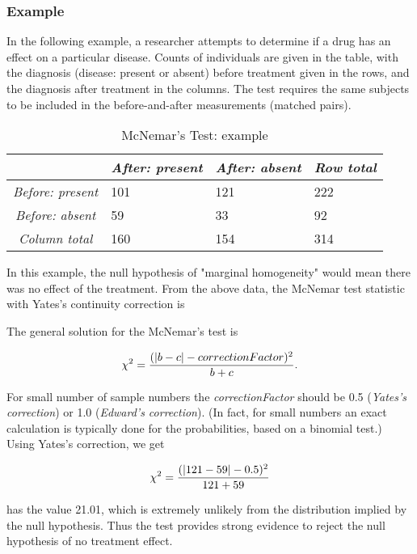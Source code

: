 \subsubsection{Example}

In the following example, a researcher attempts to determine if a drug has an effect on a particular disease. Counts of individuals are given in the table, with the diagnosis (disease: present or absent) before treatment given in the rows, and the diagnosis after treatment in the columns. The test requires the same subjects to be included in the before-and-after measurements (matched pairs).

\begin{table}
  \centering
  \begin{tabular}{|c|l l l|}
  \hline
  & \emph{After: present} & \emph{After: absent} & \emph{Row total} \\
  \hline
  \emph{Before: present} & 101 & 121 & 222 \\
  \emph{Before: absent} & 59 & 33 & 92 \\
  \emph{Column total} & 160 & 154 & 314 \\
  \hline
  \end{tabular}

  \caption{McNemar's Test: example}\label{table:McNemarExample}
\end{table}


In this example, the null hypothesis of "marginal homogeneity" would mean there was no effect of the treatment. From the above data, the McNemar test statistic with Yates's continuity correction is

The general solution for the McNemar's test is

\begin{equation}
    \chi^2 = {(|b-c|-correctionFactor)^2 \over b+c}.
\end{equation}

For small number of sample numbers the \emph{correctionFactor} should be 0.5 (\emph{Yates's correction}) or 1.0 (\emph{Edward's correction}). (In fact, for small numbers an exact calculation is typically done for the probabilities, based on a binomial test.) Using Yates's correction, we get

\begin{equation}
    \chi^2 = {(|121 - 59| - 0.5)^2 \over {121 + 59}}
\end{equation}

has the value 21.01, which is extremely unlikely from the distribution implied by the null hypothesis. Thus the test provides strong evidence to reject the null hypothesis of no treatment effect.


